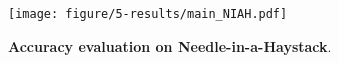 \begin{figure}[t]
    \centering
    \texttt{[image: figure/5-results/main\_NIAH.pdf]}
    \caption{\textbf{Accuracy evaluation on Needle-in-a-Haystack}. 
    }%
    \label{fig:evaluation:main_niah}
    \vspace{10pt}
\end{figure}

